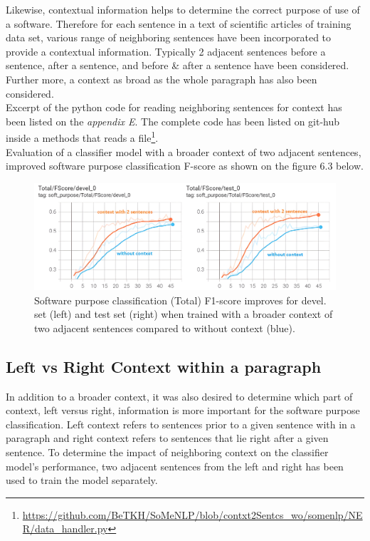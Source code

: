 Likewise, contextual information helps to determine the correct purpose of use of a software. Therefore for each sentence in a text of scientific articles of training data set, various range of neighboring sentences have been incorporated to provide a contextual information. Typically 2 adjacent sentences before a sentence, after a sentence, and before \& after a sentence have been considered. Further more, a context as broad as the whole paragraph has also been considered. \\

Excerpt of the python code for reading neighboring sentences for context has been listed on the \emph{appendix E}. The complete code has been listed on git-hub inside a methods that reads a file\footnote{\url{https://github.com/BeTKH/SoMeNLP/blob/contxt2Sentcs_wo/somenlp/NER/data_handler.py}}. \\

Evaluation of a classifier model with a broader context of two adjacent sentences, improved software purpose classification F-score as shown on the figure 6.3 below. 

\begin{figure}[htbp]
	\centering
	\includegraphics[width=.86\textwidth]{4.graphics/figures/ch_6/2.left_context_vs_right/HD/braoderContextFscore}
	\caption{Software purpose classification (Total) F1-score improves for devel. set (left) and test set (right) when trained with a broader context of two adjacent sentences compared to without context (blue).}
	\label{fig:chapter06:with}
\end{figure}

\subsection{Left vs Right Context within a paragraph}
\label{sec:chapter06:leftvsright}

In addition to a broader context, it was also desired to determine which part of context, left versus right, information is more important for the software purpose classification. Left context refers to sentences prior to a given sentence with in  a paragraph and right context refers to sentences that lie right after a given sentence. To determine the impact of neighboring context on the classifier model's performance, two adjacent sentences from the left and right has been used to train the model separately.  \\

